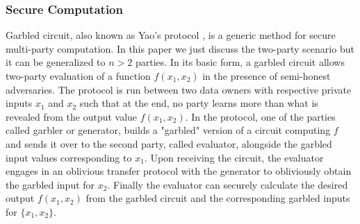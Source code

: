 \subsubsection{Secure Computation}
Garbled circuit, also known as Yao's protocol \cite{Yao,yao2},  is a generic method for secure multi-party computation. In this paper we just discuss the two-party scenario but it can be generalized to $n > 2$ parties. In its basic form, a garbled circuit allows two-party evaluation of a function $f(x_1,x_2)$ in the presence of semi-honest adversaries. The protocol is run between two data owners with respective private inputs $x_1$ and $x_2$ such that at the end, no party learns more  
than what is revealed from the output value $f(x_1,x_2)$. In the protocol, one of the parties called
garbler or generator, builds a "garbled" version of a circuit computing $f$ and sends it over to the second party, called evaluator, alongside the garbled input values 
corresponding to $x_1$.  Upon receiving the circuit, the evaluator 
engages in an oblivious transfer protocol with the generator to obliviously obtain the garbled input for $x_2$. Finally the evaluator can securely calculate the desired output $f(x_1, x_2)$ from the garbled circuit and the corresponding garbled inputs for $\{x_1,x_2\}$.
